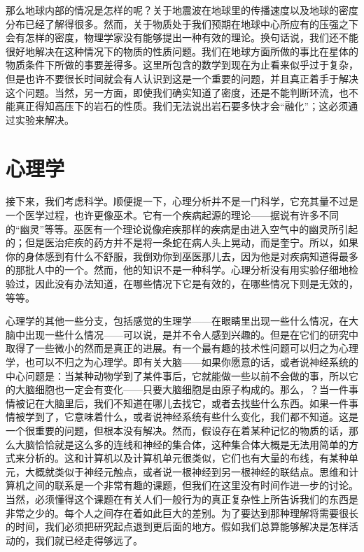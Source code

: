 那么地球内部的情况是怎样的呢？关于地震波在地球里的传播速度以及地球的密度分布已经了解得很多。然而，关于物质处于我们预期在地球中心所应有的压强之下会有怎样的密度，物理学家没有能够提出一种有效的理论。换句话说，我们还不能很好地解决在这种情况下的物质的性质问题。我们在地球方面所做的事比在星体的物质条件下所做的事要差得多。这里所包含的数学到现在为止看来似乎过于复杂，但是也许不要很长时间就会有人认识到这是一个重要的问题，并且真正着手于解决这个问题。当然，另一方面，即使我们确实知道了密度，还是不能判断环流，也不能真正得知高压下的岩石的性质。我们无法说出岩石要多快才会“融化”；这必须通过实验来解决。


\section{心理学}

接下来，我们考虑科学。顺便提一下，心理分析并不是一门科学，它充其量不过是一个医学过程，也许更像巫术。它有一个疾病起源的理论——据说有许多不同的“幽灵”等等。巫医有一个理论说像疟疾那样的疾病是由进入空气中的幽灵所引起的；但是医治疟疾的药方并不是将一条蛇在病人头上晃动，而是奎宁。所以，如果你的身体感到有什么不舒服，我倒劝你到巫医那儿去，因为他是对疾病知道得最多的那批人中的一个。然而，他的知识不是一种科学。心理分析没有用实验仔细地检验过，因此没有办法知道，在哪些情况下它是有效的，在哪些情况下则是无效的，等等。

心理学的其他一些分支，包括感觉的生理学——在眼睛里出现一些什么情况，在大脑中出现一些什么情况——可以说，是并不令人感到兴趣的。但是在它们的研究中取得了一些微小的然而是真正的进展。有一个最有趣的技术性问题可以归之为心理学，也可以不归之为心理学。即有关大脑——如果你愿意的话，或者说神经系统的中心问题是：当某种动物学到了某件事后，它就能做一些以前不会做的事，所以它的大脑细胞也一定会有变化——只要大脑细胞是由原子构成的。那么，？当一件事情被记在大脑里后，我们不知道在哪儿去找它，或者去找些什么东西。如果一件事情被学到了，它意味着什么，或者说神经系统有些什么变化，我们都不知道。这是一个很重要的问题，但根本没有解决。然而，假设存在着某种记忆的物质的话，那么大脑恰恰就是这么多的连线和神经的集合体，这种集合体大概是无法用简单的方式来分析的。这和计算机以及计算机单元很类似，它们也有大量的布线，有某种单元，大概就类似于神经元触点，或者说一根神经到另一根神经的联结点。思维和计算机之间的联系是一个非常有趣的课题，但我们在这里没有时间作进一步的讨论。当然，必须懂得这个课题在有关人们一般行为的真正复杂性上所告诉我们的东西是非常之少的。每个人之间存在着如此巨大的差别。为了要达到那种理解将需要很长的时间，我们必须把研究起点退到更后面的地方。假如我们总算能够解决是怎样活动的，我们就已经走得够远了。



